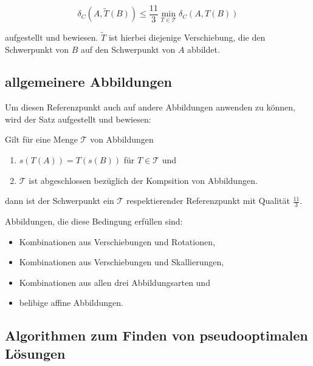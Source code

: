 $$\delta_C (A,\tilde{T}(B))\leq\frac{11}{3}\min_{T\in\mathcal{T}}\delta_C(A,T(B))$$


aufgestellt und bewiesen. $\tilde{T}$ ist hierbei diejenige Verschiebung, die den Schwerpunkt von $B$ auf den Schwerpunkt von $A$ abbildet.

\subsection{allgemeinere Abbildungen}

Um diesen Referenzpunkt auch auf andere Abbildungen anwenden zu können, wird der Satz aufgestellt und bewiesen:

Gilt für eine Menge $\mathcal{T}$  von Abbildungen 
\begin{enumerate}
\item $s(T(A))=T(s(B))$ für $T\in\mathcal{T}$ und 
\item $\mathcal{T}$ ist abgeschlossen bezüglich der Kompsition von Abbildungen.
\end{enumerate}
dann ist der Schwerpunkt ein $\mathcal{T}$ respektierender Referenzpunkt mit Qualität $\frac{11}{3}$.

Abbildungen, die diese Bedingung erfüllen sind: 
\begin{itemize}
\item Kombinationen aus Verschiebungen und Rotationen,
\item Kombinationen aus Verschiebungen und Skallierungen,
\item Kombinationen aus allen drei Abbildungsarten und
\item belibige affine Abbildungen.
\end{itemize}

\subsection{Algorithmen zum Finden von pseudooptimalen Lösungen}

